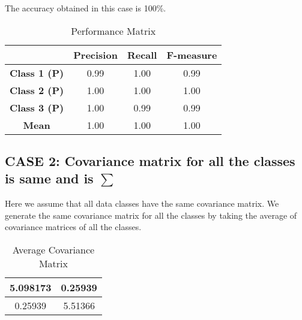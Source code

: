 The accuracy obtained in this case is 100\%.\\

\begin{table}[H]
\centering
\begin{tabular}{|c|c|c|c|}
\hline
\ & \textbf{Precision} & \textbf{Recall} & \textbf{F-measure}\\
\hline
\textbf{Class 1 (P)} & 0.99 & 1.00 & 0.99 \\
\hline 
\textbf{Class 2 (P)} & 1.00 & 1.00 & 1.00 \\
\hline
\textbf{Class 3 (P)} & 1.00 & 0.99 & 0.99 \\
\hline
\textbf{Mean} & 1.00 & 1.00 & 1.00 \\
\hline
\end{tabular}
\caption{Performance Matrix}
\label{tab:Table6}
\end{table}


\subsection{CASE 2: Covariance matrix for all the classes is same and is \textbf{$\sum$}}
Here we assume that all data classes have the same covariance matrix. We generate the same covariance matrix for all the classes by taking the average of covariance matrices of all the classes. \\

\begin{table}[H]
        \centering
        \begin{tabular}{|c|c|}
            \hline
            
            5.098173   & 0.25939   \\
            \hline
            0.25939   & 5.51366  \\
            \hline
        \end{tabular}
        \caption{Average Covariance Matrix}
        \label{tab:Table7}
\end{table}



